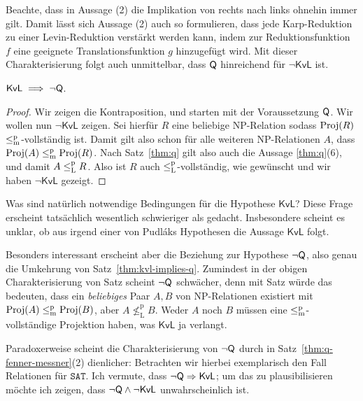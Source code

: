Beachte, dass in Aussage (2) die Implikation von rechts nach links ohnehin immer gilt. 
Damit lässt sich Aussage (2) auch so formulieren, dass jede Karp-Reduktion zu einer Levin-Reduktion verstärkt werden kann, indem zur Reduktionsfunktion $f$ eine geeignete Translationsfunktion $g$ hinzugefügt wird.
Mit dieser Charakterisierung folgt auch unmittelbar, dass $\mathsf{Q}$ hinreichend für $\neg\mathsf{KvL}$ ist.


\begin{theorem}\label{thm:kvl-implies-q}
    $\mathsf{KvL} \implies \neg\mathsf{Q}$.
\end{theorem}
\begin{proof}
    Wir zeigen die Kontraposition, und starten mit der Voraussetzung $\mathsf{Q}$.
    Wir wollen nun $\neg\mathsf{KvL}$ zeigen. Sei hierfür $R$ eine beliebige NP-Relation sodass $\operatorname{Proj}(R)$ $\leq_\mathrm{m}^\mathrm{p}$-vollständig ist.
    Damit gilt also schon für alle weiteren NP-Relationen $A$, dass $\operatorname{Proj}(A)\leq_\mathrm{m}^\mathrm{p}\operatorname{Proj}(R)$.
    Nach Satz~\ref{thm:q} gilt also auch die Aussage \ref{thm:q}(6), und damit $A\leq_\mathrm{L}^\mathrm{p} R$. Also ist $R$ auch $\leq_\mathrm{L}^\mathrm{p}$-vollständig, wie gewünscht und wir haben $\neg\mathsf{KvL}$ gezeigt.
\end{proof}

Was sind natürlich notwendige Bedingungen für die Hypothese $\mathsf{KvL}$? Diese Frage erscheint tatsächlich wesentlich schwieriger als gedacht. Insbesondere scheint es unklar, ob aus irgend einer von Pudláks Hypothesen die Aussage $\mathsf{KvL}$ folgt.

Besonders interessant erscheint aber die Beziehung zur Hypothese $\neg\mathsf{Q}$, also genau die Umkehrung von Satz~\ref{thm:kvl-implies-q}.
Zumindest in der obigen Charakterisierung von Satz \label{thm:q-as-levin} scheint $\neg\mathsf{Q}$ schwächer, denn mit Satz \label{thm:q-as-levin} würde das bedeuten, dass ein \emph{beliebiges} Paar $A,B$ von NP-Relationen existiert mit $\operatorname{Proj}(A)\leq_\mathrm{m}^\mathrm{p} \operatorname{Proj}(B)$, aber $A \not\leq_\mathrm L^\mathrm p B$. Weder $A$ noch $B$ müssen eine $\leq_\mathrm{m}^\mathrm{p}$-vollständige Projektion haben, was $\mathsf{KvL}$ ja verlangt.

Paradoxerweise scheint die Charakterisierung von $\neg\mathsf{Q}$ durch \citeauthor{fenner_inverting_2003} in Satz~\ref{thm:q-fenner-messner}(2) dienlicher:
Betrachten wir hierbei exemplarisch den Fall Relationen für $\mathtt{SAT}$. Ich vermute, dass $\neg\mathsf{Q}\Rightarrow \mathsf{KvL}$; um das zu plausibilisieren möchte ich zeigen, dass $\neg\mathsf{Q}\land\neg\mathsf{KvL}$ unwahrscheinlich ist.

